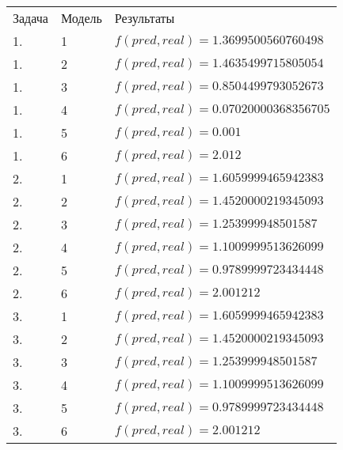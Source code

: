 \documentclass[a4paper,12pt,twoside]{article}
\begin{document}
		\begin{table}[ht!]
			\begin{tabular}{lll}
				Задача &  Модель & Результаты \\
				1. & 1 & $f(pred, real) = 1.3699500560760498$\\
				1. & 2 & $f(pred, real) = 1.4635499715805054$\\
				1. & 3 & $f(pred, real) = 0.8504499793052673$\\
				1. & 4 & $f(pred, real) = 0.07020000368356705$\\
				1. & 5 & $f(pred, real) = 0.001$\\
				1. & 6 & $f(pred, real) = 2.012$\\
				
				2. & 1 & $f(pred, real) = 1.6059999465942383$\\
				2. & 2 & $f(pred, real) = 1.4520000219345093$\\
				2. & 3 & $f(pred, real) = 1.253999948501587$\\
				2. & 4 & $f(pred, real) = 1.1009999513626099$\\
				2. & 5 & $f(pred, real) = 0.9789999723434448$\\
				2. & 6 & $f(pred, real) = 2.001212$\\
				
				3. & 1 & $f(pred, real) = 1.6059999465942383$\\
				3. & 2 & $f(pred, real) = 1.4520000219345093$\\
				3. & 3 & $f(pred, real) = 1.253999948501587$\\
				3. & 4 & $f(pred, real) = 1.1009999513626099$\\
				3. & 5 & $f(pred, real) = 0.9789999723434448$\\
				3. & 6 & $f(pred, real) = 2.001212$\\
			
			\end{tabular}
		\end{table}
	
\end{document}
